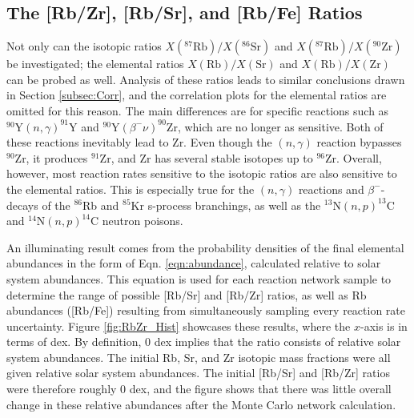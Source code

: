 
\subsection{The [Rb/Zr], [Rb/Sr], and [Rb/Fe] Ratios}

Not only can the isotopic ratios $X(^{87}\mathrm{Rb})/X(^{86}\mathrm{Sr})$ and $X(^{87}\mathrm{Rb})/X(^{90}\mathrm{Zr})$ be investigated; the elemental ratios $X(\mathrm{Rb})/X(\mathrm{Sr})$ and $X(\mathrm{Rb})/X(\mathrm{Zr})$ can be probed as well. Analysis of these ratios leads to similar conclusions drawn in Section \ref{subsec:Corr}, and the correlation plots for the elemental ratios are omitted for this reason. The main differences are for specific reactions such as $^{90}\mathrm{Y}(n,\gamma)^{91}\mathrm{Y}$ and $^{90}\mathrm{Y}(\beta^{-}\nu)^{90}\mathrm{Zr}$, which are no longer as sensitive. Both of these reactions inevitably lead to Zr. Even though the $(n,\gamma)$ reaction bypasses $^{90}$Zr, it produces $^{91}$Zr, and Zr has several stable isotopes up to $^{96}$Zr. Overall, however, most reaction rates sensitive to the isotopic ratios are also sensitive to the elemental ratios. This is especially true for the $(n,\gamma)$ reactions and $\beta^{-}$-decays of the $^{86}$Rb and $^{85}$Kr s-process branchings, as well as the $^{13}\mathrm{N}(n,p)^{13}\mathrm{C}$ and $^{14}\mathrm{N}(n,p)^{14}\mathrm{C}$ neutron poisons.

An illuminating result comes from the probability densities of the final elemental abundances in the form of Eqn. \ref{eqn:abundance}, calculated relative to solar system abundances. This equation is used for each reaction network sample to determine the range of possible [Rb/Sr] and [Rb/Zr] ratios, as well as Rb abundances ([Rb/Fe]) resulting from simultaneously sampling every reaction rate uncertainty. Figure \ref{fig:RbZr_Hist} showcases these results, where the $x$-axis is in terms of dex. By definition, 0 dex implies that the ratio consists of relative solar system abundances. The initial Rb, Sr, and Zr isotopic mass fractions were all given relative solar system abundances. The initial [Rb/Sr] and [Rb/Zr] ratios were therefore roughly 0 dex, and the figure shows that there was little overall change in these relative abundances after the Monte Carlo network calculation.

